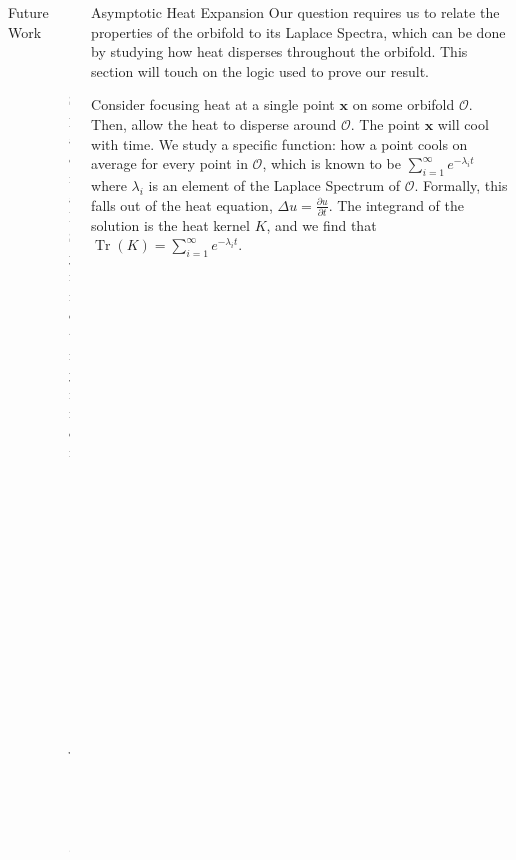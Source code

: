 \documentclass[final]{beamer}
\newlength{\onecolwid}
\newcommand{\pder}[2]{\frac{\partial#1}{\partial#2}}
\DeclareMathOperator{\tr}{Tr}
\begin{document}
\begin{frame}[t]
\begin{columns}[t]
\begin{column}{\onecolwid}
\begin{block}{Future Work}
\begin{columns}[t]
\begin{column}[t]{0.61\textwidth}
\end{column}
\begin{column}[t]{0.37\textwidth}
\begin{figure}
    \includegraphics[width=\textwidth]{images/space_group_sym.jpg}
    \caption{Spacial Symmetry from \textit{The Symmetries of Things}}
\end{figure}
\end{column}
\end{columns}
\end{block}
\end{column}
\begin{column}{\onecolwid} %
    \begin{block}{Asymptotic Heat Expansion}
        Our question requires us to relate the properties of the orbifold
        to its Laplace Spectra, which can be done by studying how heat
        disperses throughout the orbifold. This section will touch on the
        logic used to prove our result.
        
        Consider focusing heat at a single point $\mathbf{x}$ on some
        orbifold $\mathcal{O}$.  Then, allow the heat to disperse around
        $\mathcal{O}$. The point $\mathbf{x}$ will cool with
        time. We study a specific function: how a point cools on average for
        every point in $\mathcal{O}$, which is known to be
        $\sum_{i=1}^{\infty}e^{-\lambda_i t}$ where $\lambda_i$ is an
        element of the Laplace Spectrum of $\mathcal{O}$. Formally, this
        falls out of the heat equation, $\Delta u = \pder{u}{t}$. The
        integrand of the solution is the heat kernel $K$, and we find that
        $\tr(K) = \sum_{i=1}^{\infty}e^{-\lambda_i t}$.
        

\end{block}
\end{column}
\end{columns}
\end{frame}
\end{document}

